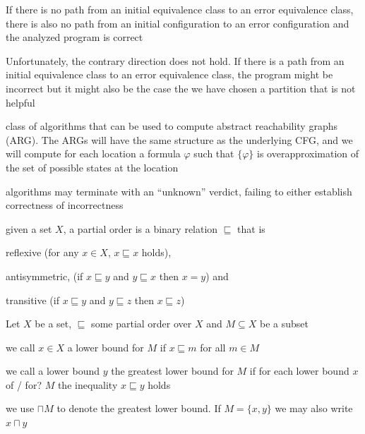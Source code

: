 \documentclass[landscape, a4paper]{article}
\begin{document}
\begin{minipage}[t]{0.2\linewidth}
\begin{betterlist}
\begin{betterlist}
			\item If there is no path from an initial equivalence class to an error equivalence class, there is also no path from an initial configuration to an error configuration and the analyzed program is correct
			\item Unfortunately, the contrary direction does not hold. If there is a path from an initial equivalence class to an error equivalence class, the program might be incorrect but it might also be the case the we have chosen a partition that is not helpful
		\end{betterlist}
		\item {}
		\item class of algorithms that can be used to compute abstract reachability graphs (ARG). The ARGs will have the same structure as the underlying CFG, and we will compute for each location a formula $\varphi$ such that $\{ \varphi \}$  is overapproximation of the set of possible states at the location
		\begin{betterlist}
			\item algorithms may terminate with an \enquote{unknown} verdict, failing to either establish correctness of incorrectness
		\end{betterlist}
		\item given a set $X$, a partial order is a binary relation $\sqsubseteq$ that is
		\begin{betterlist}
			\item reflexive (for any $x \in X$, $x \sqsubseteq x$ holds),
			\item antisymmetric, (if $x \sqsubseteq y$ and $y \sqsubseteq x$ then $x = y$) and
			\item transitive (if $x \sqsubseteq y$ and $y \sqsubseteq z$ then $x \sqsubseteq z$)
			\item {}
		\end{betterlist}
		\item Let $X$ be a set, $\sqsubseteq$ some partial order over $X$ and $M \subseteq X$ be a subset
		\begin{betterlist}
			\item we call $x \in X$ a \alert{lower bound} for $M$ if $x \sqsubseteq m$ for all $m \in M$
			\item we call a lower bound $y$ the \alert{greatest lower bound} for $M$ if for each lower bound $x$ of / for? $M$ the inequality $x \sqsubseteq y$ holds
			\begin{betterlist}
				\item we use $\sqcap M$ to denote the \alert{greatest lower bound}. If $M = \{x, y\}$ we may also write $x \sqcap y$

\end{betterlist}
\end{betterlist}
\end{betterlist}
\end{minipage}
\end{document}

